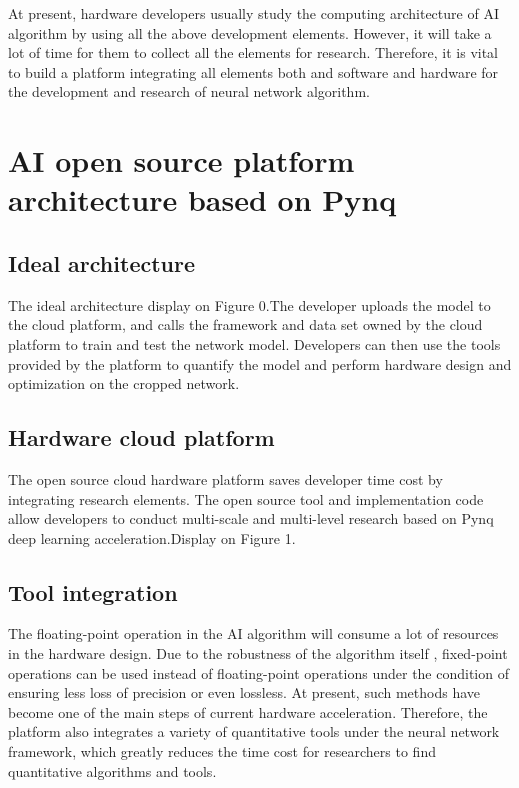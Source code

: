 At present, hardware developers usually study the computing architecture of AI algorithm by using all the above development elements. However, it will take a lot of time for them to collect all the elements for research. Therefore, it is vital to build a platform integrating all elements both and software and hardware for the development and research of neural network algorithm.

\section{AI open source platform architecture based on Pynq}

\subsection{Ideal architecture}
The ideal architecture display on Figure 0.The developer uploads the model to the cloud platform, and calls the framework and data set owned by the cloud platform to train and test the network model. Developers can then use the tools provided by the platform to quantify the model and perform hardware design and optimization on the cropped network.

\subsection{Hardware cloud platform}
The open source cloud hardware platform saves developer time cost by integrating research elements. The open source tool and implementation code allow developers to conduct multi-scale and multi-level research based on Pynq deep learning acceleration.Display on Figure 1.

\subsection{Tool integration}
The floating-point operation in the AI algorithm will consume a lot of resources in the hardware design. Due to the robustness of the algorithm itself \cite{courbariaux2014low}, fixed-point operations can be used instead of floating-point operations under the condition of ensuring less loss of precision or even lossless. At present, such methods have become one of the main steps of current hardware acceleration. Therefore, the platform also integrates a variety of quantitative tools under the neural network framework, which greatly reduces the time cost for researchers to find quantitative algorithms and tools.

